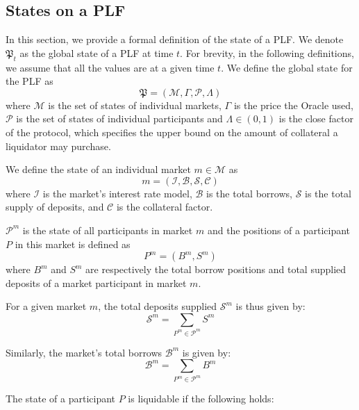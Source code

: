 \subsection{States on a PLF}
In this section, we provide a formal definition of the state of a PLF.
We denote $\mathfrak{P}_t$ as the global state of a PLF at time $t$.
For brevity, in the following definitions, we assume that all the values are at a given time $t$.
We define the global state for the PLF as
\[
  \mathfrak{P} = (\mathcal{M},\Gamma, \mathcal{P}, \Lambda)
\]
where $\mathcal{M}$ is the set of states of individual markets, $\Gamma$ is the price the Oracle used, $\mathcal{P}$ is the set of states of individual participants and $\Lambda \in (0, 1)$ is the close factor of the protocol, which specifies the upper bound on the amount of collateral a liquidator may purchase.

We define the state of an individual market
$m \in \mathcal{M}$ as 
$$m = (\mathcal{I}, \mathcal{B}, \mathcal{S}, \mathcal{C})$$
where
$\mathcal{I}$ is the market's interest rate model,
$\mathcal{B}$ is the total borrows,
$\mathcal{S}$ is the total supply of deposits,
and $\mathcal{C}$ is the collateral factor.

$\mathcal{P}^m$ is the state of all participants in market $m$ and the positions of a participant $P$ in this market is defined as
\[
  P^m = (B^m,S^m)
\]
where $B^m$ and $S^m$ are respectively the total borrow positions and total supplied deposits of a market participant in market $m$.

For a given market $m$, the total deposits supplied $\mathcal{S}^m$ is thus given by:
\begin{equation}
    \mathcal{S}^m = \sum_{P^m\in \mathcal{P}^m} S^m
\end{equation}

Similarly, the market's total borrows $\mathcal{B}^m$ is given by:
\begin{equation}
    \mathcal{B}^m = \sum_{P^m\in \mathcal{P}^m} B^m
\end{equation}

The state of a participant $P$ is liquidable if the following holds: 

